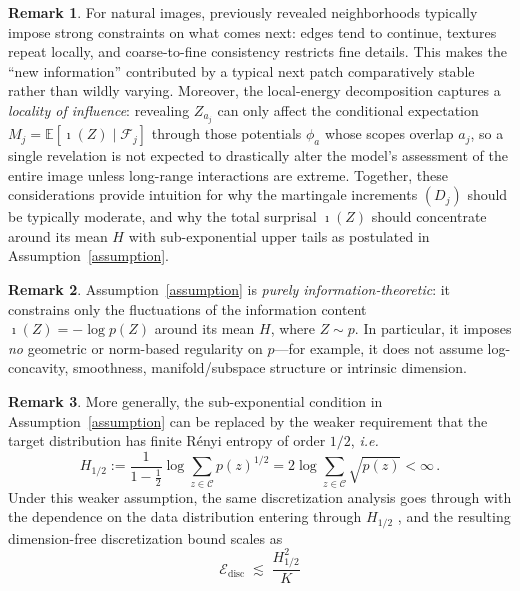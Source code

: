\documentclass[11pt]{article}
\newcommand{\info}{\imath}         %
\theoremstyle{definition}
\newtheorem{remark}{Remark}
\newcommand{\E}{\mathbb{E}}
\numberwithin{equation}{section}
\begin{document}
\begin{remark}
For natural images, previously revealed neighborhoods typically impose strong
constraints on what comes next: edges tend to continue, textures repeat locally, and coarse-to-fine
consistency restricts fine details. This makes the ``new information'' contributed by a typical next patch
comparatively stable rather than wildly varying. Moreover, the local-energy decomposition captures a
\emph{locality of influence}: revealing \(Z_{a_j}\) can only affect the conditional expectation
\(M_j=\E[\info(Z)\mid\mathcal F_j]\) through those potentials \(\phi_a\) whose scopes overlap \(a_j\), so a single
revelation is not expected to drastically alter the model's assessment of the entire image unless long-range
interactions are extreme. Together, these considerations provide intuition for why the martingale increments
\((D_j)\) should be typically moderate, and why the total surprisal \(\info(Z)\) should concentrate around its
mean \(H\) with sub-exponential upper tails as postulated in Assumption~\ref{assumption}.
\end{remark}



\begin{remark}
Assumption~\ref{assumption} is \emph{purely information-theoretic}: it constrains only the fluctuations of the information content $\info(Z)=-\log p(Z)$ around its mean $H$, where $Z\sim p$. In particular, it imposes \emph{no} geometric or norm-based regularity on $p$---for example, it does not assume log-concavity, smoothness, manifold/subspace structure or intrinsic dimension.

\end{remark}
\begin{remark}
More generally, the sub-exponential condition in Assumption~\ref{assumption} can be replaced by the weaker requirement that the target distribution has finite R\'enyi entropy of order $1/2$, \textit{i.e.}
\[
H_{1/2}
:= \frac{1}{1-\tfrac12}\log\sum_{z\in\mathcal C}p(z)^{1/2}
= 2\log\sum_{z\in\mathcal C}\sqrt{p(z)}
<\infty\,.
\]
Under this weaker assumption, the same discretization analysis goes through with the dependence on the data distribution entering through $H_{1/2}$ , and the resulting dimension-free discretization bound scales as
\[
\mathcal{E}_{\mathrm{disc}} \;\lesssim\; \frac{H_{1/2}^2}{K}
\]

\end{remark}
\end{document}
